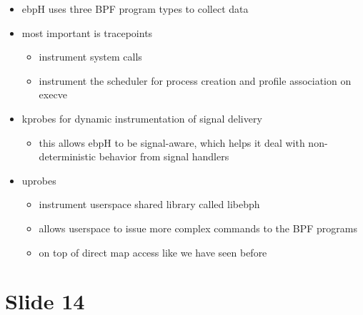 \documentclass[
  12pt]{findlay}
\providecommand{\tightlist}{\setlength{\itemsep}{0pt}\setlength{\parskip}{0pt}}
\begin{document}
\begin{itemize}
\tightlist
\item
  ebpH uses three BPF program types to collect data
\item
  most important is tracepoints

  \begin{itemize}
  \tightlist
  \item
    instrument system calls
  \item
    instrument the scheduler for process creation and profile
    association on execve
  \end{itemize}
\item
  kprobes for dynamic instrumentation of signal delivery

  \begin{itemize}
  \tightlist
  \item
    this allows ebpH to be signal-aware, which helps it deal with
    non-deterministic behavior from signal handlers
  \end{itemize}
\item
  uprobes

  \begin{itemize}
  \tightlist
  \item
    instrument userspace shared library called libebph
  \item
    allows userspace to issue more complex commands to the BPF programs
  \item
    on top of direct map access like we have seen before
  \end{itemize}
\end{itemize}

\hypertarget{slide-14}{%
\section{Slide 14}\label{slide-14}}
\end{document}
